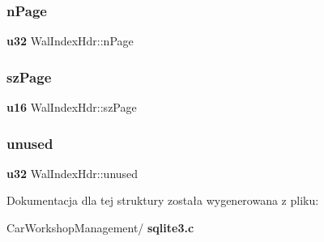 \mbox{\label{struct_wal_index_hdr_ae4ca33947cd629feb9dce2b1f976c364}} 
\subsubsection{nPage}
{\footnotesize\ttfamily \textbf{ u32} Wal\+Index\+Hdr\+::n\+Page}

\mbox{\label{struct_wal_index_hdr_a74e9182803402942cf6e45d8e23589c7}} 
\subsubsection{szPage}
{\footnotesize\ttfamily \textbf{ u16} Wal\+Index\+Hdr\+::sz\+Page}

\mbox{\label{struct_wal_index_hdr_aa00596b4ad38dce7f97261a49ce64d74}} 
\subsubsection{unused}
{\footnotesize\ttfamily \textbf{ u32} Wal\+Index\+Hdr\+::unused}



Dokumentacja dla tej struktury została wygenerowana z pliku\+:\begin{DoxyCompactItemize}
\item 
Car\+Workshop\+Management/\textbf{ sqlite3.\+c}\end{DoxyCompactItemize}
